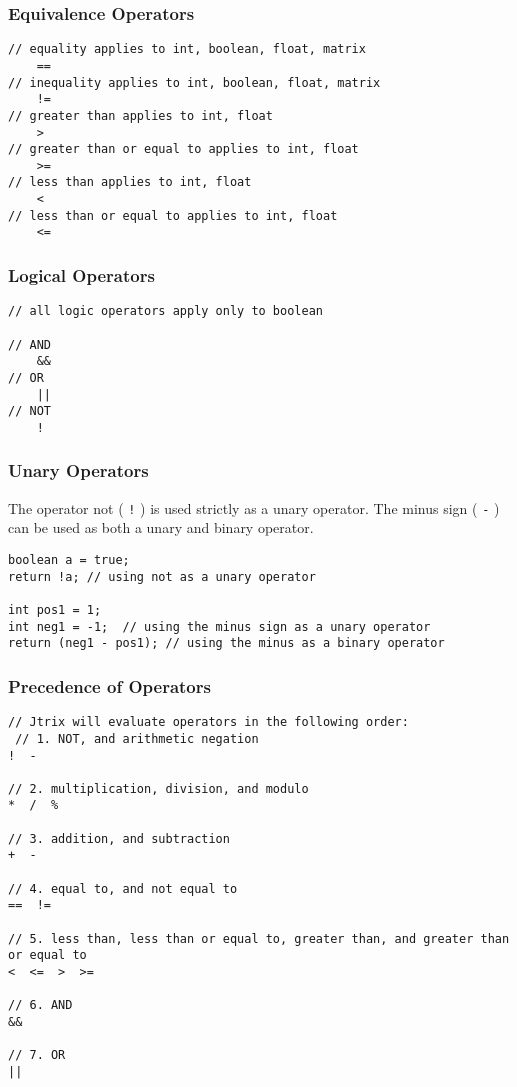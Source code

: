 \documentclass[12pt]{report}
\begin{document}
\subsubsection{Equivalence Operators}
\begin{lstlisting}
// equality applies to int, boolean, float, matrix
	==
// inequality applies to int, boolean, float, matrix
	!=
// greater than applies to int, float
	>
// greater than or equal to applies to int, float
	>=
// less than applies to int, float
	<
// less than or equal to applies to int, float
	<=
\end{lstlisting}

\subsubsection{Logical Operators}
\begin{lstlisting}
// all logic operators apply only to boolean

// AND
	&&
// OR
	||
// NOT
	!
\end{lstlisting}

\subsubsection{Unary Operators}
The operator not ( \texttt{!} ) is used strictly as a unary operator. The minus sign ( \texttt{-} ) can be used as both a unary and binary operator.
\begin{lstlisting}
boolean a = true;
return !a; // using not as a unary operator

int pos1 = 1; 
int neg1 = -1;  // using the minus sign as a unary operator
return (neg1 - pos1); // using the minus as a binary operator
\end{lstlisting}

\subsubsection{Precedence of Operators}
\begin{lstlisting}
// Jtrix will evaluate operators in the following order:
 // 1. NOT, and arithmetic negation
!  - 

// 2. multiplication, division, and modulo
*  /  %

// 3. addition, and subtraction
+  - 

// 4. equal to, and not equal to
==  !=

// 5. less than, less than or equal to, greater than, and greater than or equal to
<  <=  >  >=

// 6. AND
&&

// 7. OR
||
\end{lstlisting}
\end{document}
